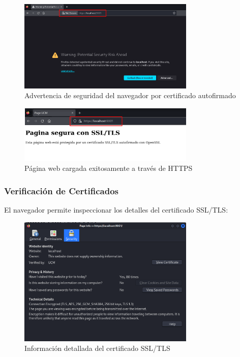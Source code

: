 \documentclass[12pt,a4paper]{article}
\begin{document}
\begin{figure}[H]
  \centering
  \includegraphics[width=0.75\textwidth]{./assets/img3.png}
  \caption{Advertencia de seguridad del navegador por certificado autofirmado}
  \label{fig:browser-warning}
\end{figure}

\begin{figure}[H]
  \centering
  \includegraphics[width=0.75\textwidth]{./assets/img4.png}
  \caption{Página web cargada exitosamente a través de HTTPS}
  \label{fig:secure-page}
\end{figure}

\subsubsection{Verificación de Certificados}

El navegador permite inspeccionar los detalles del certificado SSL/TLS:

\begin{figure}[H]
  \centering
  \includegraphics[width=0.75\textwidth]{./assets/img5.png}
  \caption{Información detallada del certificado SSL/TLS}
  \label{fig:cert-details}
\end{figure}
\end{document}
